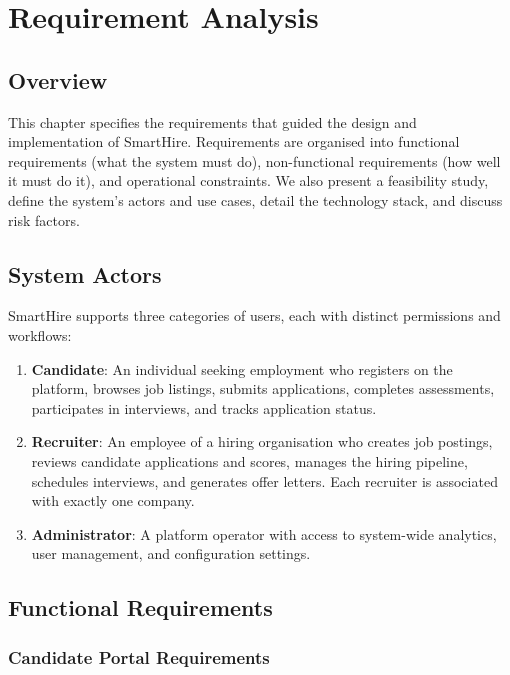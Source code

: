 \setcounter{chapter}{2}
\chapter{Requirement Analysis}
\label{ch:requirements}

\section{Overview}
\label{sec:req-overview}

This chapter specifies the requirements that guided the design and implementation of SmartHire. Requirements are organised into functional requirements (what the system must do), non-functional requirements (how well it must do it), and operational constraints. We also present a feasibility study, define the system's actors and use cases, detail the technology stack, and discuss risk factors.

\section{System Actors}
\label{sec:actors}

SmartHire supports three categories of users, each with distinct permissions and workflows:

\begin{enumerate}[leftmargin=1.5em]
  \item \textbf{Candidate}: An individual seeking employment who registers on the platform, browses job listings, submits applications, completes assessments, participates in interviews, and tracks application status.
  \item \textbf{Recruiter}: An employee of a hiring organisation who creates job postings, reviews candidate applications and scores, manages the hiring pipeline, schedules interviews, and generates offer letters. Each recruiter is associated with exactly one company.
  \item \textbf{Administrator}: A platform operator with access to system-wide analytics, user management, and configuration settings.
\end{enumerate}

\section{Functional Requirements}
\label{sec:functional-reqs}

\subsection{Candidate Portal Requirements}

